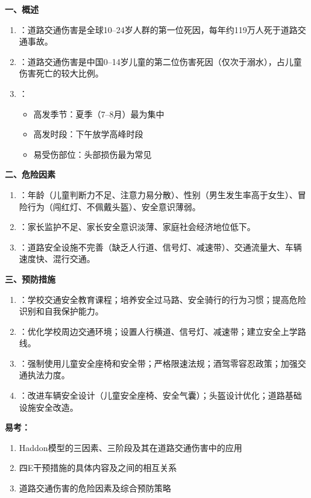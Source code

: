 \begin{keybox}
\textbf{一、概述}
\begin{enumerate}[leftmargin=*]
    \item {}：道路交通伤害是全球10--24岁人群的第一位死因，每年约119万人死于道路交通事故。
    \item {}：道路交通伤害是中国0--14岁儿童的第二位伤害死因（仅次于溺水），占儿童伤害死亡的较大比例。
    \item {}：
    \begin{itemize}
        \item 高发季节：夏季（7--8月）最为集中
        \item 高发时段：下午放学高峰时段
        \item 易受伤部位：头部损伤最为常见
    \end{itemize}
\end{enumerate}

\textbf{二、危险因素}
\begin{enumerate}[leftmargin=*]
    \item {}：年龄（儿童判断力不足、注意力易分散）、性别（男生发生率高于女生）、冒险行为（闯红灯、不佩戴头盔）、安全意识薄弱。
    \item {}：家长监护不足、家长安全意识淡薄、家庭社会经济地位低下。
    \item {}：道路安全设施不完善（缺乏人行道、信号灯、减速带）、交通流量大、车辆速度快、混行交通。
\end{enumerate}

\textbf{三、预防措施}
\begin{enumerate}[leftmargin=*]
    \item {}：学校交通安全教育课程；培养安全过马路、安全骑行的行为习惯；提高危险识别和自我保护能力。
    \item {}：优化学校周边交通环境；设置人行横道、信号灯、减速带；建立安全上学路线。
    \item {}：强制使用儿童安全座椅和安全带；严格限速法规；酒驾零容忍政策；加强交通执法力度。
    \item {}：改进车辆安全设计（儿童安全座椅、安全气囊）；头盔设计优化；道路基础设施安全改造。
\end{enumerate}
\end{keybox}

\begin{exambox}
\textbf{易考：}
\begin{enumerate}[leftmargin=*]
    \item Haddon模型的三因素、三阶段及其在道路交通伤害中的应用
    \item 四E干预措施的具体内容及之间的相互关系
    \item 道路交通伤害的危险因素及综合预防策略
\end{enumerate}
\end{exambox}

